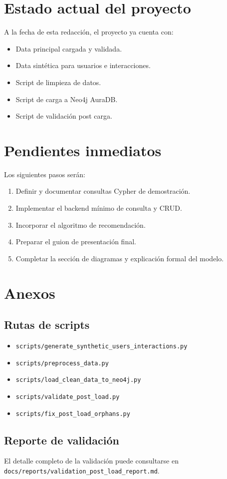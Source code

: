 \documentclass[12pt,a4paper]{article}
\begin{document}
\section{Estado actual del proyecto}

A la fecha de esta redacción, el proyecto ya cuenta con:

\begin{itemize}
    \item Data principal cargada y validada.
    \item Data sintética para usuarios e interacciones.
    \item Script de limpieza de datos.
    \item Script de carga a Neo4j AuraDB.
    \item Script de validación post carga.
\end{itemize}

\section{Pendientes inmediatos}

Los siguientes pasos serán:

\begin{enumerate}
    \item Definir y documentar consultas Cypher de demostración.
    \item Implementar el backend mínimo de consulta y CRUD.
    \item Incorporar el algoritmo de recomendación.
    \item Preparar el guion de presentación final.
    \item Completar la sección de diagramas y explicación formal del modelo.
\end{enumerate}

\section{Anexos}

\subsection{Rutas de scripts}

\begin{itemize}
    \item \texttt{scripts/generate\_synthetic\_users\_interactions.py}
    \item \texttt{scripts/preprocess\_data.py}
    \item \texttt{scripts/load\_clean\_data\_to\_neo4j.py}
    \item \texttt{scripts/validate\_post\_load.py}
    \item \texttt{scripts/fix\_post\_load\_orphans.py}
\end{itemize}

\subsection{Reporte de validación}

El detalle completo de la validación puede consultarse en \texttt{docs/reports/validation\_post\_load\_report.md}.
\end{document}
